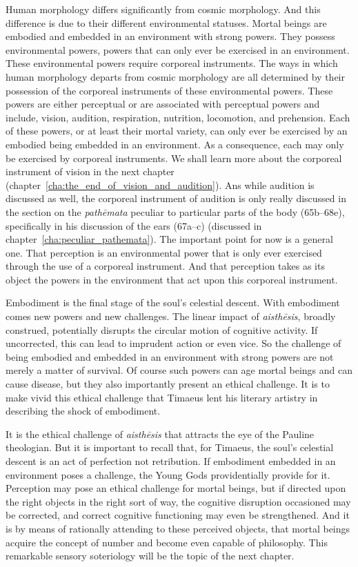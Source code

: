 Human morphology differs significantly from cosmic morphology. And this difference is due to their different environmental statuses. Mortal beings are embodied and embedded in an environment with strong powers. They possess environmental powers, powers that can only ever be exercised in an environment. These environmental powers require corporeal instruments. The ways in which human morphology departs from cosmic morphology are all determined by their possession of the corporeal instruments of these environmental powers. These powers are either perceptual or are associated with perceptual powers and include, vision, audition, respiration, nutrition, locomotion, and prehension. Each of these powers, or at least their mortal variety, can only ever be exercised by an embodied being embedded in an environment. As a consequence, each may only be exercised by corporeal instruments. We shall learn more about the corporeal instrument of vision in the next chapter (chapter~\ref{cha:the_end_of_vision_and_audition}). Ans while audition is discussed as well, the corporeal instrument of audition is only really discussed in the section on the \emph{pathēmata} peculiar to particular parts of the body (65b–68e), specifically in his discussion of the ears (67a--c) (discussed in chapter~\ref{cha:peculiar_pathemata}). The important point for now is a general one. That perception is an environmental power that is only ever exercised through the use of a corporeal instrument. And that perception takes as its object the powers in the environment that act upon this corporeal instrument.

Embodiment is the final stage of the soul's celestial descent. With embodiment comes new powers and new challenges. The linear impact of \emph{aisthēsis}, broadly construed, potentially disrupts the circular motion of cognitive activity. If uncorrected, this can lead to imprudent action or even vice. So the challenge of being embodied and embedded in an environment with strong powers are not merely a matter of survival. Of course such powers can age mortal beings and can cause disease, but they also importantly present an ethical challenge. It is to make vivid this ethical challenge that Timaeus lent his literary artistry in describing the shock of embodiment.

It is the ethical challenge of \emph{aisthēsis} that attracts the eye of the Pauline theologian. But it is important to recall that, for Timaeus, the soul's celestial descent is an act of perfection not retribution. If embodiment embedded in an environment poses a challenge, the Young Gods providentially provide for it. Perception may pose an ethical challenge for mortal beings, but if directed upon the right objects in the right sort of way, the cognitive disruption occasioned may be corrected, and correct cognitive functioning may even be strengthened. And it is by means of rationally attending to these perceived objects, that mortal beings acquire the concept of number and become even capable of philosophy. This remarkable sensory soteriology will be the topic of the next chapter.



